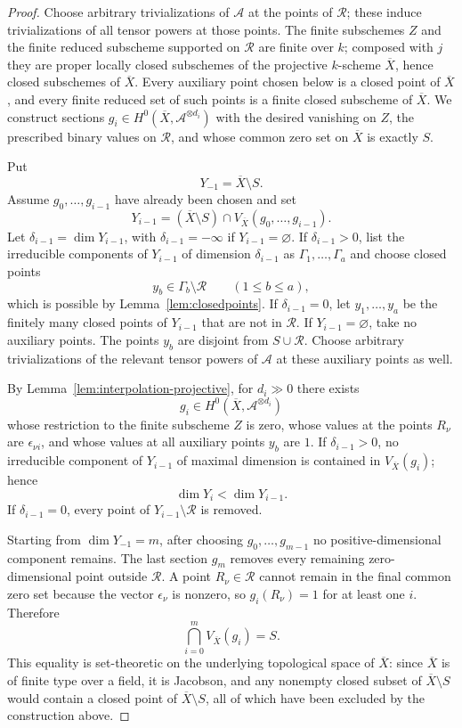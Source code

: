 \documentclass{lms}
\newcommand{\Ample}{\mathcal A}
\newcommand{\barX}{\overline{X}}
\begin{document}
\begin{proof}
Choose arbitrary trivializations of $\Ample$ at the points of $\mathcal R$; these induce trivializations of all tensor powers at those points.  The finite subschemes $Z$ and the finite reduced subscheme supported on $\mathcal R$ are finite over $k$; composed with $j$ they are proper locally closed subschemes of the projective $k$-scheme $\barX$, hence closed subschemes of $\barX$.  Every auxiliary point chosen below is a closed point of $\barX$, and every finite reduced set of such points is a finite closed subscheme of $\barX$.  We construct sections $g_i\in H^0(\barX,\Ample^{\otimes d_i})$ with the desired vanishing on $Z$, the prescribed binary values on $\mathcal R$, and whose common zero set on $\barX$ is exactly $S$.

Put
\[
        Y_{-1}=\barX\setminus S.
\]
Assume $g_0,\ldots,g_{i-1}$ have already been chosen and set
\[
        Y_{i-1}=(\barX\setminus S)\cap V_{\barX}(g_0,\ldots,g_{i-1}).
\]
Let $\delta_{i-1}=\dim Y_{i-1}$, with $\delta_{i-1}=-\infty$ if $Y_{i-1}=\varnothing$.  If $\delta_{i-1}>0$, list the irreducible components of $Y_{i-1}$ of dimension $\delta_{i-1}$ as $\Gamma_1,\ldots,\Gamma_a$ and choose closed points
\[
        y_b\in\Gamma_b\setminus \mathcal R
        \qquad(1\le b\le a),
\]
which is possible by Lemma~\ref{lem:closedpoints}.  If $\delta_{i-1}=0$, let $y_1,\ldots,y_a$ be the finitely many closed points of $Y_{i-1}$ that are not in $\mathcal R$.  If $Y_{i-1}=\varnothing$, take no auxiliary points.  The points $y_b$ are disjoint from $S\cup\mathcal R$.  Choose arbitrary trivializations of the relevant tensor powers of $\Ample$ at these auxiliary points as well.

By Lemma~\ref{lem:interpolation-projective}, for $d_i\gg0$ there exists
\[
        g_i\in H^0(\barX,\Ample^{\otimes d_i})
\]
whose restriction to the finite subscheme $Z$ is zero, whose values at the points $R_\nu$ are $\epsilon_{\nu i}$, and whose values at all auxiliary points $y_b$ are $1$.  If $\delta_{i-1}>0$, no irreducible component of $Y_{i-1}$ of maximal dimension is contained in $V_{\barX}(g_i)$; hence
\[
        \dim Y_i<\dim Y_{i-1}.
\]
If $\delta_{i-1}=0$, every point of $Y_{i-1}\setminus\mathcal R$ is removed.

Starting from $\dim Y_{-1}=m$, after choosing $g_0,\ldots,g_{m-1}$ no positive-dimensional component remains.  The last section $g_m$ removes every remaining zero-dimensional point outside $\mathcal R$.  A point $R_\nu\in\mathcal R$ cannot remain in the final common zero set because the vector $\epsilon_\nu$ is nonzero, so $g_i(R_\nu)=1$ for at least one $i$.  Therefore
\[
        \bigcap_{i=0}^{m}V_{\barX}(g_i)=S.
\]
This equality is set-theoretic on the underlying topological space of $\barX$: since $\barX$ is of finite type over a field, it is Jacobson, and any nonempty closed subset of $\barX\setminus S$ would contain a closed point of $\barX\setminus S$, all of which have been excluded by the construction above.


\end{proof}
\end{document}
